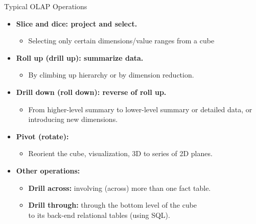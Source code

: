 \begin{frame}{Typical OLAP Operations}
	\begin{itemize}
		\item \textbf{{\color{airforceblue}Slice and dice}: project and select.}
		      \begin{itemize}
			      \item Selecting only certain dimensions/value ranges from a cube
		      \end{itemize}
		\item \textbf{{\color{airforceblue}Roll up} (drill up): summarize data.}
		      \begin{itemize}
			      \item By climbing up hierarchy or by dimension reduction.
		      \end{itemize}
		\item \textbf{{\color{airforceblue}Drill down} (roll down): reverse of roll up.}
		      \begin{itemize}
			      \item From higher-level summary to lower-level summary or detailed data, or introducing new dimensions.
		      \end{itemize}
		\item \textbf{{\color{airforceblue}Pivot} (rotate):}
		      \begin{itemize}
			      \item Reorient the cube, visualization, 3D to series of 2D planes.
		      \end{itemize}
		\item \textbf{Other operations:}
		      \begin{itemize}
			      \item \textbf{{\color{airforceblue}Drill across}:} involving (across) more than one fact table.
			      \item \textbf{{\color{airforceblue}Drill through}:} through the bottom level of the cube \\ to its back-end relational tables (using SQL).
		      \end{itemize}
	\end{itemize}
\end{frame}

